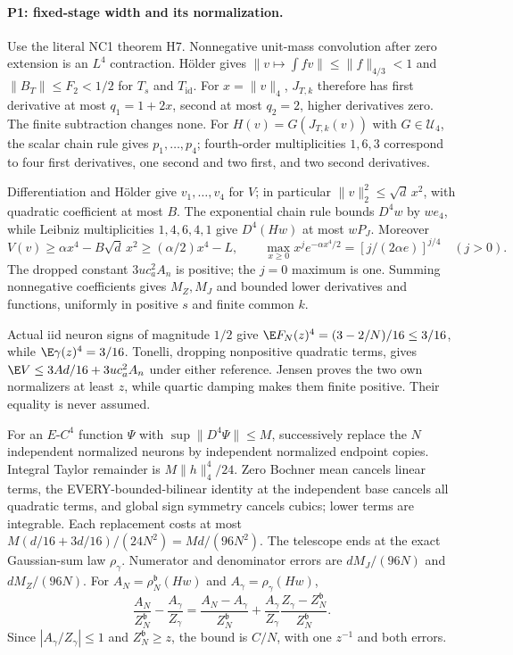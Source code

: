 \paragraph{P1: fixed-stage width and its normalization.}
Use the literal NC1 theorem H7. Nonnegative unit-mass convolution after
zero extension is an $L^4$ contraction. H\"older gives
$\|v\mapsto\int fv\|\le\|f\|_{4/3}<1$ and
$\|B_T\|\le F_2<1/2$ for $T_s$ and $T_{\mathrm{id}}$. For
$x=\|v\|_4$, $J_{T,k}$ therefore has first derivative at most $q_1=1+2x$,
second at most $q_2=2$, higher derivatives zero. The finite subtraction
changes none. For $H(v)=G(J_{T,k}(v))$ with $G\in\mathcal U_4$, the scalar
chain rule gives $p_1,\ldots,p_4$; fourth-order multiplicities $1,6,3$
correspond to four first derivatives, one second and two first, and two
second derivatives.

Differentiation and H\"older give $v_1,\ldots,v_4$ for $V$; in particular
$\|v\|_2^2\le\sqrt d\,x^2$, with quadratic coefficient at most $B$.
The exponential chain rule bounds $D^4w$ by $we_4$, while Leibniz
multiplicities $1,4,6,4,1$ give $D^4(Hw)$ at most $wP_J$. Moreover
\[
 V(v)\ge\alpha x^4-B\sqrt d\,x^2\ge(\alpha/2)x^4-L,\qquad
 \max_{x\ge0}x^je^{-\alpha x^4/2}=[j/(2\alpha e)]^{j/4}\quad(j>0).
\]
The dropped constant $3uc_a^2A_n$ is positive; the $j=0$ maximum is one.
Summing nonnegative coefficients gives $M_Z,M_J$ and bounded lower
derivatives and functions, uniformly in positive $s$ and finite common $k$.

Actual iid neuron signs of magnitude $1/2$ give
$\E F_N(z)^4=(3-2/N)/16\le3/16$, while $\E\gamma(z)^4=3/16$.
Tonelli, dropping nonpositive quadratic terms, gives
$\E V\le3Ad/16+3uc_a^2A_n$ under either reference. Jensen proves the two
own normalizers at least $z$, while quartic damping makes them finite
positive. Their equality is never assumed.

For an $E$-$C^4$ function $\Psi$ with $\sup\|D^4\Psi\|\le M$, successively
replace the $N$ independent normalized neurons by independent normalized
endpoint copies. Integral Taylor remainder is $M\|h\|_4^4/24$.
Zero Bochner mean cancels linear terms, the EVERY-bounded-bilinear identity
at the independent base cancels all quadratic terms, and global sign
symmetry cancels cubics; lower terms are integrable. Each replacement
costs at most $M(d/16+3d/16)/(24N^2)=Md/(96N^2)$.
The telescope ends at the exact Gaussian-sum law $\rho_\gamma$.
Numerator and denominator errors are $dM_J/(96N)$ and $dM_Z/(96N)$.
For $A_N=\rho_N^{\mathfrak b}(Hw)$ and $A_\gamma=\rho_\gamma(Hw)$,
\[
 \frac{A_N}{Z_N^{\mathfrak b}}-\frac{A_\gamma}{Z_\gamma}
 =\frac{A_N-A_\gamma}{Z_N^{\mathfrak b}}
 +\frac{A_\gamma}{Z_\gamma}\frac{Z_\gamma-Z_N^{\mathfrak b}}
                                 {Z_N^{\mathfrak b}} .
\]
Since $|A_\gamma/Z_\gamma|\le1$ and $Z_N^{\mathfrak b}\ge z$, the bound
is $C/N$, with one $z^{-1}$ and both errors.

